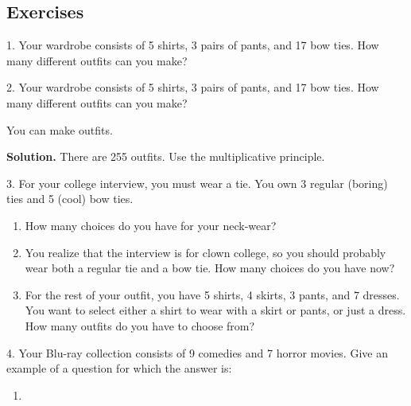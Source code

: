 \documentclass[10pt,]{book}
\theoremstyle{plain}
\theoremstyle{definition}
\theoremstyle{definition}
\theoremstyle{definition}
\theoremstyle{definition}
\numberwithin{equation}{chapter}
\begin{document}
\subsection[{Exercises}]{Exercises}\label{exercises_counting-addmult}
\begin{exerciselist}
\item[1.]\hypertarget{exercise-84}{}\hypertarget{p-745}{}%
Your wardrobe consists of 5 shirts, 3 pairs of pants, and 17 bow ties. How many different outfits can you make?%
\par\smallskip
\item[2.]\hypertarget{exercise-85}{}\noindent%
\hypertarget{p-747}{}%
Your wardrobe consists of 5 shirts, 3 pairs of pants, and 17 bow ties. How many different outfits can you make?%
\par
\hypertarget{p-748}{}%
You can make  \framebox[5em]{\raisebox{1ex}{}} outfits.%
\par
\medskip\noindent%
\textbf{Solution.}\quad \hypertarget{p-749}{}%
There are 255 outfits. Use the multiplicative principle.%
\par
\item[3.]\hypertarget{exercise-86}{}\hypertarget{p-750}{}%
For your college interview, you must wear a tie. You own 3 regular (boring) ties and 5 (cool) bow ties. \leavevmode%
\begin{enumerate}[label=(\alph*)]
\item\hypertarget{li-335}{}How many choices do you have for your neck-wear?%
\item\hypertarget{li-336}{}\hypertarget{p-751}{}%
You realize that the interview is for clown college, so you should probably wear both a regular tie and a bow tie. How many choices do you have now?%
\item\hypertarget{li-337}{}\hypertarget{p-752}{}%
For the rest of your outfit, you have 5 shirts, 4 skirts, 3 pants, and 7 dresses. You want to select either a shirt to wear with a skirt or pants, or just a dress. How many outfits do you have to choose from?%
\end{enumerate}
%
\par\smallskip
\item[4.]\hypertarget{exercise-87}{}\hypertarget{p-755}{}%
Your Blu-ray collection consists of 9 comedies and 7 horror movies. Give an example of a question for which the answer is: \leavevmode%
\begin{enumerate}[label=(\alph*)]
\item\hypertarget{li-341}{}\hypertarget{p-756}{}%

\end{enumerate}
\end{exerciselist}
\end{document}
